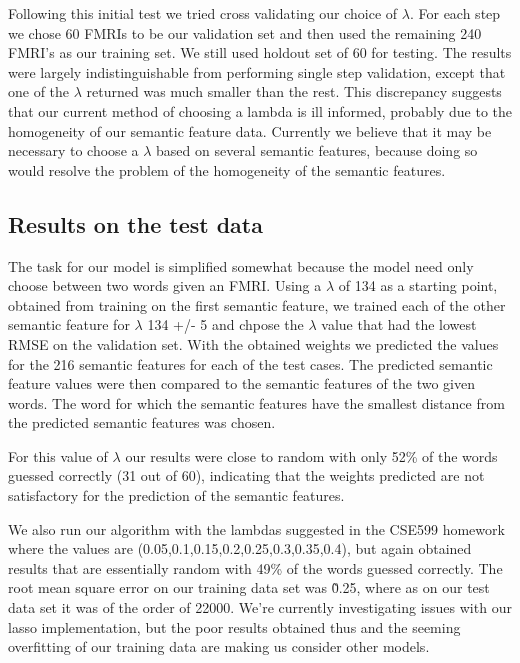 \documentclass{article} %
\begin{document}
Following this initial test we tried cross validating our choice of $\lambda$. For each step we chose 60 FMRIs to be our validation set and then used the remaining 240 FMRI's as our training set. We still used holdout set of 60 for testing. The results were largely indistinguishable from performing single step validation, except that one of the $\lambda$ returned was much smaller than the rest. This discrepancy suggests that our current method of choosing a lambda is ill informed, probably due to the homogeneity of our semantic feature data. Currently we believe that it may be necessary to choose a $\lambda$ based on several semantic features, because doing so would resolve the problem of the homogeneity of the semantic features.



\subsection{Results on the test data}

The task for our model is simplified somewhat because the model need only choose between two words given an FMRI. Using a $\lambda$ of 134 as a starting point, obtained from training on the first semantic feature, we trained each of the other semantic feature for $\lambda$ 134 +/- 5 and chpose the $\lambda$ value that had the lowest RMSE on the validation set. With the obtained weights we predicted the values for the 216 semantic features for each of the test cases. The predicted semantic feature values were then compared to the semantic features of the two given words. The word for which the semantic features have the smallest distance from the predicted semantic features was chosen. 

For this value of $\lambda$ our results were close to random with only 52\% of the words guessed correctly (31 out of 60), indicating that the weights predicted are not satisfactory for the prediction of the semantic features.

We also run our algorithm with the lambdas suggested in the CSE599 homework where the values are (0.05,0.1,0.15,0.2,0.25,0.3,0.35,0.4), but again obtained results that are essentially random with 49\% of the words guessed correctly. The root mean square error on our training data set was \~0.25, where as on our test data set it was of the order of 22000. We're currently investigating issues with our lasso implementation, but the poor results obtained thus and the seeming overfitting of our training data are making us consider other models.
\end{document}
